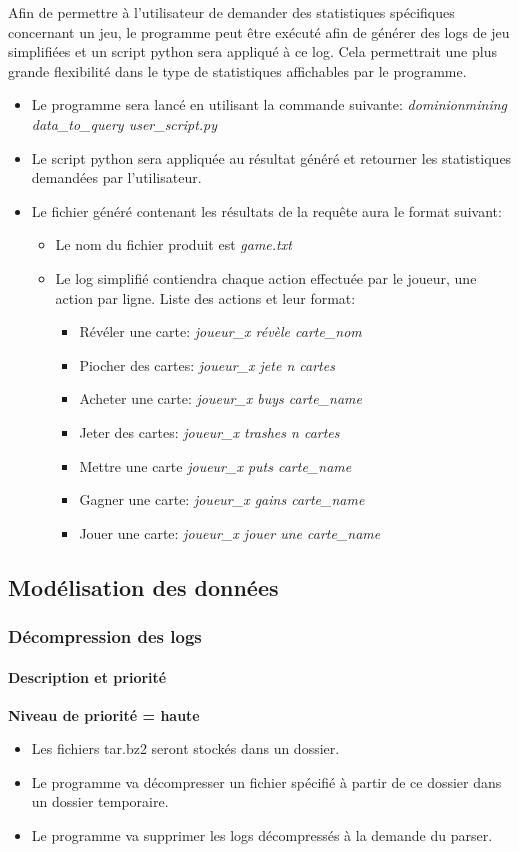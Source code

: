 Afin de permettre à l'utilisateur de demander des statistiques spécifiques concernant un jeu, le programme peut être exécuté afin de générer des logs de jeu simplifiées et un script python sera appliqué à ce log. Cela permettrait une plus grande flexibilité dans le type de statistiques affichables par le programme.
\begin{itemize}
\item Le programme sera lancé en utilisant la commande suivante: \textit{dominionmining data\_to\_query user\_script.py}
 \item Le script python sera appliquée au résultat généré et retourner les statistiques demandées par l'utilisateur.
\item Le fichier généré contenant les résultats de la requête aura le format suivant:
\begin{itemize}
\item Le nom du fichier produit est \textit{game.txt}
\item Le log simplifié contiendra chaque action effectuée par le joueur, une action par ligne. Liste des actions et leur format:
\begin{itemize}
\item Révéler une carte: \textit{joueur\_x révèle carte\_nom}
\item Piocher des cartes: \textit{joueur\_x jete n cartes}
\item Acheter une carte: \textit{joueur\_x buys carte\_name}
\item Jeter des cartes: \textit{joueur\_x trashes n cartes}
\item Mettre une carte \textit{joueur\_x puts carte\_name}
\item Gagner une carte: \textit{joueur\_x gains carte\_name}
\item Jouer une carte: \textit{joueur\_x jouer une carte\_name}

\end{itemize}
\end{itemize}
\end{itemize}
\fi
\subsection{Modélisation des données}

\subsubsection{Décompression des logs}
\paragraph*{Description et priorité}
\textbf{Niveau de priorité = haute}\\
\begin{itemize}
  \item Les fichiers tar.bz2 seront stockés dans un dossier.
  \item Le programme va  décompresser un fichier spécifié à partir de ce dossier dans un dossier temporaire.
  \item Le programme va  supprimer les logs décompressés  à la demande du parser.
\end{itemize}

